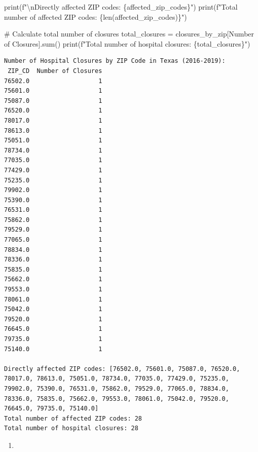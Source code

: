 \documentclass[
  letterpaper,
  DIV=11,
  numbers=noendperiod]{scrartcl}
\newenvironment{Shaded}{\begin{snugshade}}{\end{snugshade}}
\newcommand{\BuiltInTok}[1]{\textcolor[rgb]{0.00,0.23,0.31}{#1}}
\newcommand{\CharTok}[1]{\textcolor[rgb]{0.13,0.47,0.30}{#1}}
\newcommand{\CommentTok}[1]{\textcolor[rgb]{0.37,0.37,0.37}{#1}}
\newcommand{\NormalTok}[1]{\textcolor[rgb]{0.00,0.23,0.31}{#1}}
\newcommand{\OperatorTok}[1]{\textcolor[rgb]{0.37,0.37,0.37}{#1}}
\newcommand{\SpecialCharTok}[1]{\textcolor[rgb]{0.37,0.37,0.37}{#1}}
\newcommand{\SpecialStringTok}[1]{\textcolor[rgb]{0.13,0.47,0.30}{#1}}
\newcommand{\StringTok}[1]{\textcolor[rgb]{0.13,0.47,0.30}{#1}}
\providecommand{\tightlist}{%
  \setlength{\itemsep}{0pt}\setlength{\parskip}{0pt}}\usepackage{longtable,booktabs,array}
\begin{document}
\begin{Shaded}
\begin{Highlighting}[]
\BuiltInTok{print}\NormalTok{(}\SpecialStringTok{f"}\CharTok{\textbackslash{}n}\SpecialStringTok{Directly affected ZIP codes: }\SpecialCharTok{\{}\NormalTok{affected\_zip\_codes}\SpecialCharTok{\}}\SpecialStringTok{"}\NormalTok{)}
\BuiltInTok{print}\NormalTok{(}\SpecialStringTok{f"Total number of affected ZIP codes: }\SpecialCharTok{\{}\BuiltInTok{len}\NormalTok{(affected\_zip\_codes)}\SpecialCharTok{\}}\SpecialStringTok{"}\NormalTok{)}

\CommentTok{\# Calculate total number of closures}
\NormalTok{total\_closures }\OperatorTok{=}\NormalTok{ closures\_by\_zip[}\StringTok{\textquotesingle{}Number of Closures\textquotesingle{}}\NormalTok{].}\BuiltInTok{sum}\NormalTok{()}
\BuiltInTok{print}\NormalTok{(}\SpecialStringTok{f"Total number of hospital closures: }\SpecialCharTok{\{}\NormalTok{total\_closures}\SpecialCharTok{\}}\SpecialStringTok{"}\NormalTok{)}
\end{Highlighting}
\end{Shaded}

\begin{verbatim}
Number of Hospital Closures by ZIP Code in Texas (2016-2019):
 ZIP_CD  Number of Closures
76502.0                   1
75601.0                   1
75087.0                   1
76520.0                   1
78017.0                   1
78613.0                   1
75051.0                   1
78734.0                   1
77035.0                   1
77429.0                   1
75235.0                   1
79902.0                   1
75390.0                   1
76531.0                   1
75862.0                   1
79529.0                   1
77065.0                   1
78834.0                   1
78336.0                   1
75835.0                   1
75662.0                   1
79553.0                   1
78061.0                   1
75042.0                   1
79520.0                   1
76645.0                   1
79735.0                   1
75140.0                   1

Directly affected ZIP codes: [76502.0, 75601.0, 75087.0, 76520.0, 78017.0, 78613.0, 75051.0, 78734.0, 77035.0, 77429.0, 75235.0, 79902.0, 75390.0, 76531.0, 75862.0, 79529.0, 77065.0, 78834.0, 78336.0, 75835.0, 75662.0, 79553.0, 78061.0, 75042.0, 79520.0, 76645.0, 79735.0, 75140.0]
Total number of affected ZIP codes: 28
Total number of hospital closures: 28
\end{verbatim}

\begin{enumerate}
\def\labelenumi{\arabic{enumi}.}
\setcounter{enumi}{1}
\tightlist
\item
\end{enumerate}
\end{document}
